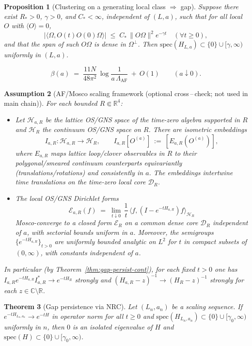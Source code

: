 \documentclass[11pt]{amsart}
\theoremstyle{plain}
\newtheorem{theorem}{Theorem}[section]
\newtheorem{proposition}[theorem]{Proposition}
\newtheorem{assumption}[theorem]{Assumption}
\theoremstyle{definition}
\theoremstyle{remark}
\begin{document}
\begin{proposition}[Clustering on a generating local class $\Rightarrow$ gap]\label{prop:cluster-to-gap}
Suppose there exist $R_*>0$, $\gamma>0$, and $C_*<\infty$, independent of $(L,a)$, such that for all local $O$ with $\langle O\rangle=0$,
\[
  |\langle\Omega, O(t)O(0)\Omega\rangle|\;\le\; C_*\,\|O\Omega\|^2 e^{-\gamma t}\quad(\forall t\ge 0),
\]
and that the span of such $O\Omega$ is dense in $\Omega^\perp$. Then $\mathrm{spec}(H_{L,a})\subset\{0\}\cup[\gamma,\infty)$ uniformly in $(L,a)$.
\end{proposition}
\[
  \beta(a)\;=\; \frac{11N}{48\pi^2}\,\log\frac{1}{a\,\Lambda_{\mathrm{AF}}}\ +\ O(1)\qquad (a\downarrow 0).
\]
\begin{assumption}[AF/Mosco scaling framework (optional cross\,–\,check; not used in main chain)]\label{assump:AF-Mosco}
For each bounded $R\Subset\mathbb R^4$:
\begin{itemize}
  \item[(i)] Let $\mathcal H_{a,R}$ be the lattice OS/GNS space of the time-zero algebra supported in $R$ and $\mathcal H_R$ the continuum OS/GNS space on $R$. There are isometric embeddings
  \[
    I_{a,R}:\mathcal H_{a,R}\to\mathcal H_R,\qquad I_{a,R}[O^{(a)}]\ :=\ [E_{a,R}(O^{(a)})],
  \]
  where $E_{a,R}$ maps lattice loop/clover observables in $R$ to their polygonal/smeared continuum counterparts equivariantly (translations/rotations) and consistently in $a$. The embeddings intertwine time translations on the time-zero local core $\mathcal D_R$.
  \item[(ii)] The local OS/GNS Dirichlet forms
  \[
    \mathcal E_{a,R}(f)\;=\; \lim_{t\downarrow 0}\,\frac{1}{t}\,\langle f,(I-e^{-tH_{a,R}})f\rangle_{\mathcal H_R}
  \]
  Mosco-converge to a closed form $\mathcal E_R$ on a common dense core $\mathcal D_R$ independent of $a$, with sectorial bounds uniform in $a$. Moreover, the semigroups $\{e^{-t H_{a,R}}\}_{t>0}$ are uniformly bounded analytic on $L^2$ for $t$ in compact subsets of $(0,\infty)$, with constants independent of $a$.
\end{itemize}
In particular (by Theorem~\ref{thm:gap-persist-cont}), for each fixed $t>0$ one has $I_{a,R}e^{-tH_{a,R}}I_{a,R}^*\to e^{-tH_R}$ strongly and $(H_{a,R}-z)^{-1}\to (H_R-z)^{-1}$ strongly for each $z\in\mathbb C\setminus\mathbb R$.
\end{assumption}
\begin{theorem}[Gap persistence via NRC]\label{thm:gap-persist}
Let $(L_n,a_n)$ be a scaling sequence. If $e^{-tH_{L_n,a_n}}\to e^{-tH}$ in operator norm for all $t\ge 0$ and $\mathrm{spec}(H_{L_n,a_n})\subset\{0\}\cup[\gamma_0,\infty)$ uniformly in $n$, then $0$ is an isolated eigenvalue of $H$ and $\mathrm{spec}(H)\subset\{0\}\cup[\gamma_0,\infty)$.
\end{theorem}
\end{document}
